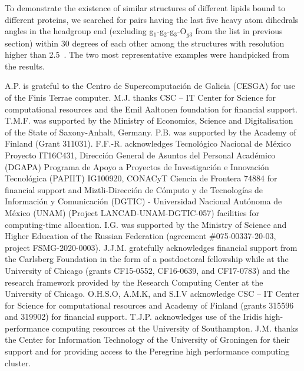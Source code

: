\documentclass[journal=jpcbfk,manuscript=article]{achemso}
\begin{document}
To demonstrate the existence of similar structures of different lipids bound to different proteins, we searched for pairs having the last five heavy atom dihedrals angles in the headgroup end (excluding g$_1$-g$_2$-g$_3$-O$_{g3}$ from the list in previous section) within
30 degrees of each other among the structures with resolution higher than 2.5~\text{\AA}. The two most representative examples
were handpicked from the results.



\begin{acknowledgement}

A.P. is grateful to the Centro de
Supercomputaci{\'o}n de Galicia (CESGA) for use of the Finis
Terrae computer.
M.J. thanks CSC -- IT Center for Science for computational resources and the Emil Aaltonen foundation for financial support.
T.M.F. was supported by the Ministry of Economics, Science
and Digitalisation of the State of Saxony-Anhalt, Germany.
P.B. was supported by the Academy of Finland (Grant 311031).
F.F.-R. acknowledges Tecnol\'{o}gico Nacional de M\'{e}xico Proyecto IT16C431, Direcci\'{o}n General de Asuntos del Personal Acad\'{e}mico (DGAPA) Programa de Apoyo a Proyectos de Investigaci\'{o}n e Innovaci\'{o}n Tecnol\'{o}gica (PAPIIT) IG100920, CONACyT Ciencia de Frontera 74884 for financial support and Miztli-Direcci\'{o}n de C\'{o}mputo y de Tecnolog\'{i}as de Informaci\'{o}n y Comunicaci\'{o}n (DGTIC) - Universidad Nacional Aut\'{o}noma de M{\'e}xico (UNAM) (Project LANCAD-UNAM-DGTIC-057) facilities for computing-time allocation.
I.G. was supported by the Ministry of Science and Higher Education of the Russian Federation (agreement \#075-00337-20-03, project FSMG-2020-0003). 
J.J.M. gratefully acknowledges financial support from the Carlsberg 
Foundation in the form of a postdoctoral fellowship while at 
the University of Chicago (grants CF15-0552, CF16-0639, and 
CF17-0783) and the research framework provided by the 
Research Computing Center at the University of Chicago.
O.H.S.O, A.M.K, and S.I.V acknowledge CSC -- IT Center for Science for computational resources and Academy of Finland (grants 315596 and 319902) for financial support.
T.J.P. acknowledges use of the Iridis high-performance computing resources at the University of Southampton.
J.M. thanks the Center for Information Technology of the University of Groningen for their support and for providing access to the Peregrine high performance computing cluster.

\end{acknowledgement}



\end{document}
